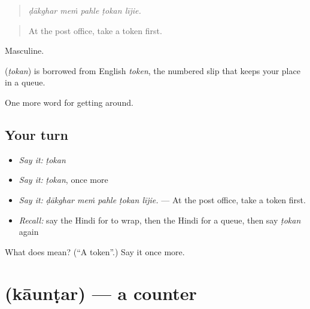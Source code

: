 \begin{quote}
    
\end{quote}

\begin{quote}
\emph{ḍākghar meṁ pahle ṭokan lījie.}
\end{quote}

\begin{quote}
At the post office, take a token first.
\end{quote}

Masculine.

\begin{cousinweb}
\textbf{} (\emph{ṭokan}) is borrowed from English \emph{token}, the numbered slip that keeps your place in a queue.
\end{cousinweb}

\begin{grammarlens}[title={What you've built}]
One more word for getting around.
\end{grammarlens}

\subsection*{Your turn}
\begin{itemize}
\raggedright
  \item \emph{Say it:} \emph{ṭokan}
  \item \emph{Say it:} \emph{ṭokan}, once more
  \item \emph{Say it:} \emph{ḍākghar meṁ pahle ṭokan lījie.} — At the post office, take a token first.
  \item \emph{Recall:} say the Hindi for to wrap, then the Hindi for a queue, then say \emph{ṭokan} again
\end{itemize}

\begin{tcolorbox}[breakable,colback=teal!4,colframe=teal!35!black,title={Before you move on}]
What does  mean? (\textquotedblleft{}A token\textquotedblright{}.) Say it once more.
\end{tcolorbox}
\section[\texorpdfstring{\hi{काउंटर} (kāunṭar)}{काउंटर (kāunṭar)}]{ (kāunṭar) — a counter}

\label{lesson:HI-C433-kauntar}



